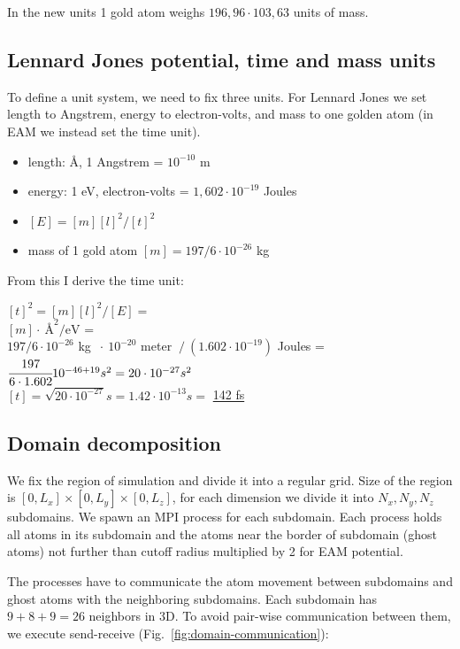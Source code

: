 \documentclass[12pt,a4paper]{article}
\begin{document}
In the new units 1 gold atom weighs $196,96 \cdot 103,63$ units of mass.

\subsection*{Lennard Jones potential, time and mass units}

To define a unit system, we need to fix three units. For Lennard Jones we set length to Angstrem, energy to electron-volts, and mass to one golden atom (in EAM we instead set the time unit).

\begin{itemize}
	\item length: Å, 1 Angstrem = $10^{-10}$ m
	\item energy: 1 eV, electron-volts = $1,602 \cdot 10^{-19}$ Joules
	\item $[E] = [m][l]^2/[t]^2$
	\item mass of 1 gold atom $[m] = 197 / 6 \cdot 10^{-26}$ kg
\end{itemize}

From this I derive the time unit:

\begin{center}
	$[t]^2 = [m][l]^2/[E] =$\\
	$[m] \cdot \ \text{Å}^2 / \text{eV}$ =\\
	$197 / 6 \cdot 10^{-26}$ kg $\ \cdot \ 10^{-20}$ meter $\ / \ (1.602 \cdot 10^{-19})$ Joules =\\
	$\cfrac{197}{6 \cdot 1.602} 10^{-46 + 19} s^2 = 20 \cdot 10^{-27} s^2$\\
	$[t] = \sqrt{20 \cdot 10^{-27}} s = 1.42 \cdot 10^{-13} s =$ \underline{142 fs}
\end{center}

\subsection*{Domain decomposition}

We fix the region of simulation and divide it into a regular grid. Size of the region is $[0, L_x] \times [0, L_y] \times [0, L_z]$, for each dimension we divide it into $N_x, N_y, N_z$ subdomains. We spawn an MPI process for each subdomain. Each process holds all atoms in its subdomain and the atoms near the border of subdomain (ghost atoms) not further than cutoff radius multiplied by 2 for EAM potential.

The processes have to communicate the atom movement between subdomains and ghost atoms with the neighboring subdomains. Each subdomain has $9+8+9=26$ neighbors in 3D. To avoid pair-wise communication between them, we execute send-receive (Fig.~\ref{fig:domain-communication}):
\end{document}

